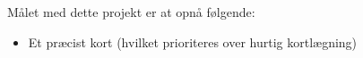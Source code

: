 Målet med dette projekt er at opnå følgende:
\begin{itemize}
\item Et præcist kort (hvilket prioriteres over hurtig kortlægning)
\end{itemize}
